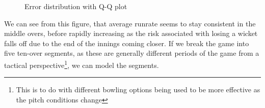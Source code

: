 \begin{figure}[h]
    \centering
    \qquad
    \caption{Error distribution with Q-Q plot}
    \label{MeanAndSDRR}
\end{figure}

We can see from this figure, that average runrate seems to stay consistent in the middle overs, before rapidly increasing as the risk associated with losing 
a wicket falls off due to the end of the innings coming closer. If we break the game into five ten-over segments, as these are generally different periods of the game
from a tactical perspective\footnote{This is to do with different bowling options being used to be more effective as the pitch conditions change}, we can model the segments.

